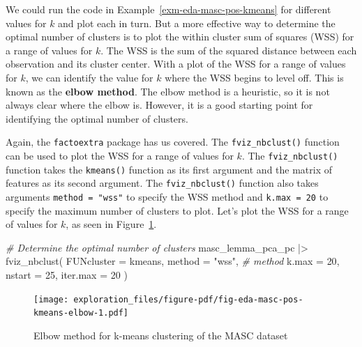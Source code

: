 \documentclass[
  letterpaper,
  DIV=11,
  numbers=noendperiod]{scrreport}
\newenvironment{Shaded}{\begin{snugshade}}{\end{snugshade}}
\newcommand{\AttributeTok}[1]{\textcolor[rgb]{0.00,0.00,0.00}{#1}}
\newcommand{\CommentTok}[1]{\textcolor[rgb]{0.00,0.00,0.00}{\textit{#1}}}
\newcommand{\DecValTok}[1]{\textcolor[rgb]{0.00,0.00,0.00}{#1}}
\newcommand{\FunctionTok}[1]{\textcolor[rgb]{0.00,0.00,0.00}{#1}}
\newcommand{\NormalTok}[1]{\textcolor[rgb]{0.00,0.00,0.00}{#1}}
\newcommand{\SpecialCharTok}[1]{\textcolor[rgb]{0.00,0.00,0.00}{#1}}
\newcommand{\StringTok}[1]{\textcolor[rgb]{0.00,0.00,0.00}{#1}}
\theoremstyle{definition}
\theoremstyle{remark}
\begin{document}
We could run the code in Example~\ref{exm-eda-masc-pos-kmeans} for
different values for \(k\) and plot each in turn. But a more effective
way to determine the optimal number of clusters is to plot the within
cluster sum of squares (WSS) for a range of values for \(k\). The WSS is
the sum of the squared distance between each observation and its cluster
center. With a plot of the WSS for a range of values for \(k\), we can
identify the value for \(k\) where the WSS begins to level off. This is
known as the \textbf{elbow method}. The elbow method is a heuristic, so
it is not always clear where the elbow is. However, it is a good
starting point for identifying the optimal number of clusters.

Again, the \texttt{factoextra} package has us covered. The
\texttt{fviz\_nbclust()} function can be used to plot the WSS for a
range of values for \(k\). The \texttt{fviz\_nbclust()} function takes
the \texttt{kmeans()} function as its first argument and the matrix of
features as its second argument. The \texttt{fviz\_nbclust()} function
also takes arguments \texttt{method\ =\ "wss"} to specify the WSS method
and \texttt{k.max\ =\ 20} to specify the maximum number of clusters to
plot. Let's plot the WSS for a range of values for \(k\), as seen in
Figure~\ref{fig-eda-masc-pos-kmeans-elbow}.

\begin{Shaded}
\begin{Highlighting}[]
\CommentTok{\# Determine the optimal number of clusters}
\NormalTok{masc\_lemma\_pca\_pc }\SpecialCharTok{|\textgreater{}} 
  \FunctionTok{fviz\_nbclust}\NormalTok{(}
    \AttributeTok{FUNcluster =}\NormalTok{ kmeans,}
    \AttributeTok{method =} \StringTok{"wss"}\NormalTok{, }\CommentTok{\# method}
    \AttributeTok{k.max =} \DecValTok{20}\NormalTok{,}
    \AttributeTok{nstart =} \DecValTok{25}\NormalTok{,}
    \AttributeTok{iter.max =} \DecValTok{20}
\NormalTok{  )}
\end{Highlighting}
\end{Shaded}

\begin{figure}[H]

{\centering \texttt{[image: exploration\_files/figure-pdf/fig-eda-masc-pos-kmeans-elbow-1.pdf]}

}

\caption{\label{fig-eda-masc-pos-kmeans-elbow}Elbow method for k-means
clustering of the MASC dataset}

\end{figure}
\end{document}
